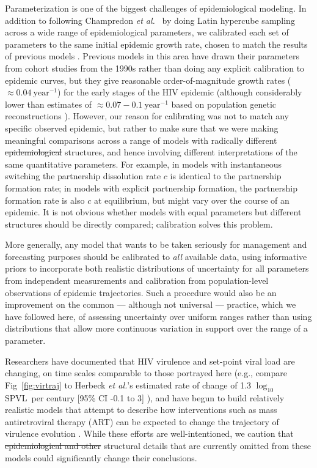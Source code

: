\documentclass[10pt,letterpaper]{article}
\renewcommand{\figurename}{Fig}
\newcommand{\Lspvl}{$\log_{10}$ SPVL}
\newcommand{\etal}{\textit{et al.}}
\providecommand{\DIFaddtex}[1]{{\protect\color{blue}\uwave{#1}}} %
\providecommand{\DIFdeltex}[1]{{\protect\color{red}\sout{#1}}}                      %
\providecommand{\DIFaddbegin}{} %
\providecommand{\DIFaddend}{} %
\providecommand{\DIFdelbegin}{} %
\providecommand{\DIFdelend}{} %
\providecommand{\DIFadd}[1]{\texorpdfstring{\DIFaddtex{#1}}{#1}} %
\providecommand{\DIFdel}[1]{\texorpdfstring{\DIFdeltex{#1}}{}} %
\newcommand{\DIFscaledelfig}{0.5}
\newlength{\DIFdelgraphicswidth} %
\newlength{\DIFdelgraphicsheight} %
\newcommand{\DIFaddincludegraphics}[2][]{{\color{blue}\fbox{\DIFOincludegraphics[#1]{#2}}}} %
\newcommand{\DIFdelincludegraphics}[2][]{%
\sbox{\DIFdelgraphicsbox}{\DIFOincludegraphics[#1]{#2}}%
\settoboxwidth{\DIFdelgraphicswidth}{\DIFdelgraphicsbox} %
\settoboxtotalheight{\DIFdelgraphicsheight}{\DIFdelgraphicsbox} %
\scalebox{\DIFscaledelfig}{%
\parbox[b]{\DIFdelgraphicswidth}{\usebox{\DIFdelgraphicsbox}\\[-\baselineskip] \rule{\DIFdelgraphicswidth}{0em}}\llap{\resizebox{\DIFdelgraphicswidth}{\DIFdelgraphicsheight}{%
\setlength{\unitlength}{\DIFdelgraphicswidth}%
\begin{picture}(1,1)%
\thicklines\linethickness{2pt} %
{\color[rgb]{1,0,0}\put(0,0){\framebox(1,1){}}}%
{\color[rgb]{1,0,0}\put(0,0){\line( 1,1){1}}}%
{\color[rgb]{1,0,0}\put(0,1){\line(1,-1){1}}}%
\end{picture}%
}\hspace*{3pt}}} %
} %
\DeclareRobustCommand{\DIFaddbegin}{\DIFOaddbegin \let\includegraphics\DIFaddincludegraphics} %
\DeclareRobustCommand{\DIFaddend}{\DIFOaddend \let\includegraphics\DIFOincludegraphics} %
\DeclareRobustCommand{\DIFdelbegin}{\DIFOdelbegin \let\includegraphics\DIFdelincludegraphics} %
\DeclareRobustCommand{\DIFdelend}{\DIFOaddend \let\includegraphics\DIFOincludegraphics} %
\begin{document}
Parameterization is one of the biggest challenges of epidemiological
modeling. In addition to following Champredon \etal\ \cite{champredon_hiv_2013} 
by doing Latin hypercube
sampling across a wide range of epidemiological parameters, we 
calibrated each set of parameters to the same initial epidemic
growth rate, chosen to match the results of previous models
\cite{shirreff_transmission_2011}.  Previous models 
in this area have drawn their
parameters from cohort studies from the 1990s
\cite{wawer2005rates,hollingsworth_hiv1_2008}
rather than doing any explicit calibration to epidemic curves,
but they give reasonable order-of-magnitude
growth rates ($\approx 0.04~\textrm{year}^{-1}$)
for the early stages of the HIV epidemic (although considerably
lower than estimates of $\approx 0.07-0.1~\textrm{year}^{-1}$
based on population genetic reconstructions \cite{faria_early_2014}).
However, our reason for calibrating was not to match any
specific observed epidemic, but rather to make sure that
we were making meaningful comparisons across a range of
models with radically different \DIFdelbegin \DIFdel{epidemiological }\DIFdelend \DIFaddbegin \DIFadd{contact }\DIFaddend structures, and
hence involving different interpretations of the same quantitative
parameters.  For example, in models with instantaneous switching the
partnership dissolution rate $c$ is identical to the partnership
formation rate; in models with explicit partnership formation,
the partnership formation rate is also $c$ at equilibrium,
but might vary over the course of an epidemic.
It is not obvious whether models with equal parameters but
different structures should be directly compared; calibration
solves this problem.

More generally, any model that wants to be
taken seriously for management and forecasting purposes should
be calibrated to \emph{all} available data, using informative
priors to incorporate both realistic distributions of uncertainty
for all parameters from independent measurements \cite{elderd_uncertainty_2006}
and calibration from population-level observations of epidemic
trajectories. Such a procedure would also be an improvement on the common --- although not universal --- %
practice, which we have followed here,
of assessing uncertainty over uniform ranges rather than
using distributions that allow more continuous variation in support over
the range of a parameter.

Researchers have documented that HIV virulence and set-point viral
load are changing, on time scales comparable to those portrayed here
(e.g., compare \figurename~\ref{fig:virtraj} to Herbeck \etal's
estimated rate of change of 1.3 \Lspvl\ per century [95\% CI -0.1 to
  3] \cite{herbeck_is_2012}), and have begun to build relatively realistic models that
attempt to describe how interventions such as mass antiretroviral
therapy (ART) can be expected to change the trajectory of virulence
evolution \cite{payne_impact_2014,roberts2015impact,herbeck_evolution_2016}.  While these
efforts are well-intentioned, we caution that 
\DIFdelbegin \DIFdel{epidemiological and
other }\DIFdelend structural details that are currently omitted from these models
could significantly change their conclusions.
\end{document}
